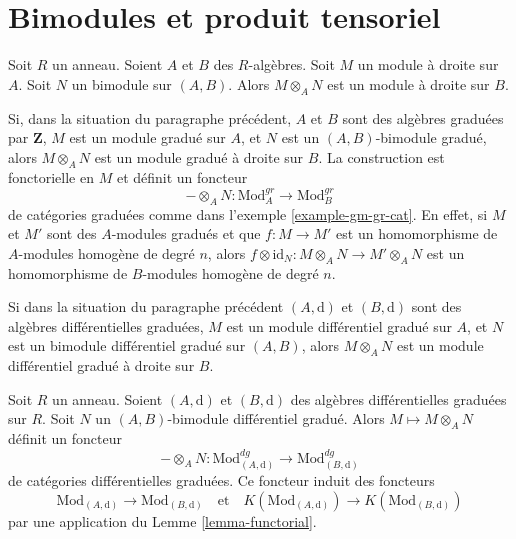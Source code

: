 \section{Bimodules et produit tensoriel}
\label{section-bimodules-tensor}

\noindent
Soit $R$ un anneau. Soient $A$ et $B$ des $R$-algèbres. Soit $M$ un module à
droite sur $A$. Soit $N$ un bimodule sur $(A, B)$. Alors $M \otimes_A N$ est un
module à droite sur $B$.

\medskip\noindent
Si, dans la situation du paragraphe précédent, $A$ et $B$ sont des algèbres
graduées par $\mathbf{Z}$, $M$ est un module gradué sur $A$, et $N$ est un
$(A, B)$-bimodule gradué, alors $M \otimes_A N$ est un module gradué à droite sur $B$. La construction
est fonctorielle en $M$ et définit un foncteur
$$
- \otimes_A N :
\text{Mod}^{gr}_A
\longrightarrow
\text{Mod}^{gr}_B
$$
de catégories graduées comme dans l'exemple \ref{example-gm-gr-cat}. En effet, si
$M$ et $M'$ sont des $A$-modules gradués et que $f : M \to M'$ est un
homomorphisme de $A$-modules homogène de degré $n$, alors $f \otimes \text{id}_N :
M \otimes_A N \to M' \otimes_A N$ est un homomorphisme de $B$-modules homogène de
degré $n$.

\medskip\noindent
Si dans la situation du paragraphe précédent $(A, \text{d})$ et $(B, \text{d})$
sont des algèbres différentielles graduées, $M$ est un module différentiel gradué
sur $A$, et $N$ est un bimodule différentiel gradué sur $(A, B)$, alors $M
\otimes_A N$ est un module différentiel gradué à droite sur $B$.

\begin{lemma}
\label{lemma-tensor}
Soit $R$ un anneau. Soient $(A, \text{d})$ et $(B, \text{d})$ des algèbres
différentielles graduées sur $R$. Soit $N$ un $(A, B)$-bimodule différentiel
gradué. Alors $M \mapsto M \otimes_A N$ définit un foncteur
$$
- \otimes_A N :
\text{Mod}^{dg}_{(A, \text{d})}
\longrightarrow
\text{Mod}^{dg}_{(B, \text{d})}
$$
de catégories différentielles graduées. Ce foncteur induit des foncteurs
$$
\text{Mod}_{(A, \text{d})} \to \text{Mod}_{(B, \text{d})}
\quad\text{et}\quad
K(\text{Mod}_{(A, \text{d})}) \to K(\text{Mod}_{(B, \text{d})})
$$
par une application du Lemme \ref{lemma-functorial}.
\end{lemma}


